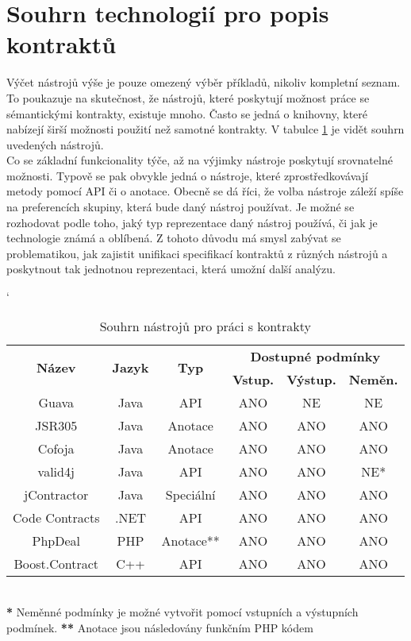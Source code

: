 	\section{Souhrn technologií pro popis kontraktů}
		Výčet nástrojů výše je pouze omezený výběr příkladů, nikoliv kompletní seznam. To poukazuje na skutečnost, že nástrojů, které poskytují možnost práce se sémantickými kontrakty, existuje mnoho. Často se jedná o knihovny, které nabízejí širší možnosti použití než samotné kontrakty. V tabulce \ref{table:tabContracts} je vidět souhrn uvedených nástrojů.\\
		
		Co se základní funkcionality týče, až na výjimky nástroje poskytují srovnatelné možnosti. Typově se pak obvykle jedná o nástroje, které zprostředkovávají metody pomocí API či o anotace. Obecně se dá říci, že volba nástroje záleží spíše na preferencích skupiny, která bude daný nástroj používat. Je možné se rozhodovat podle toho, jaký typ reprezentace daný nástroj používá, či jak je technologie známá a oblíbená. Z tohoto důvodu má smysl zabývat se problematikou, jak zajistit unifikaci specifikací kontraktů z různých nástrojů a poskytnout tak jednotnou reprezentaci, která umožní další analýzu. 		
		
		\begin{table}[H]
		\catcode`
		\begin{tabular}{|c||c|c|c|c|c|}
			\hline
			\multirow{2}{*}{\bf Název} & \multirow{2}{*}{\bf Jazyk} & \multirow{2}{*}{\bf Typ} & \multicolumn{3}{c|}{\bf Dostupné podmínky}\\
				\cline{4-6}
					& & & {\bf Vstup.} & {\bf Výstup.} & {\bf Neměn.}\\
				\hline
				\hline
					  Guava & Java & API & ANO & NE & NE\\
					  JSR305 & Java & Anotace & ANO & ANO & ANO\\
					  Cofoja & Java & Anotace & ANO & ANO & ANO\\
					  valid4j & Java & API & ANO & ANO & NE*\\
					  jContractor & Java & Speciální & ANO & ANO & ANO\\
					  Code Contracts & .NET & API & ANO & ANO & ANO\\
					  PhpDeal & PHP & Anotace** & ANO & ANO & ANO\\					  
					  Boost.Contract & C++ & API & ANO & ANO & ANO\\
				\hline
		\end{tabular}\\
				
		\footnotesize
			\noindent
			\- \- \- \textbf{*} Neměnné podmínky je možné vytvořit pomocí vstupních a výstupních podmínek.
			\- \- \- \- \- \- \- \textbf{**} Anotace jsou následovány funkčním PHP kódem
					
		\caption{Souhrn nástrojů pro práci s kontrakty}
		\label{table:tabContracts}
		\end{table}	